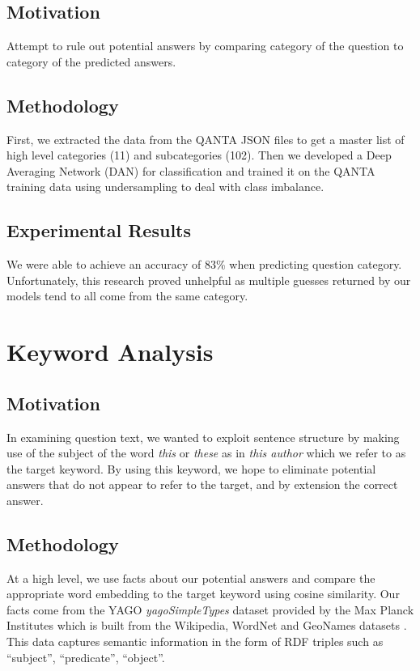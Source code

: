 \documentclass[11pt,a4paper]{article}
\begin{document}
\subsection{Motivation}
Attempt to rule out potential answers by comparing category of the question to category of the predicted answers.

\subsection{Methodology}
First, we extracted the data from the \textsc{QANTA} JSON files to get a master list of high level categories (11) and subcategories (102).  Then we developed a Deep Averaging Network (\textsc{DAN}) for classification and trained it on the \textsc{QANTA} training data using undersampling to deal with class imbalance.

\subsection{Experimental Results}
We were able to achieve an accuracy of 83\% when predicting question category.  Unfortunately, this research proved unhelpful as multiple guesses returned by our models tend to all come from the same category.


\section{Keyword Analysis}

\subsection{Motivation}
In examining question text, we wanted to exploit sentence structure by making use of the subject of the word \textit{this} or \textit{these} as in \textit{this author} which we refer to as the target keyword.  By using this keyword, we hope to eliminate potential answers that do not appear to refer to the target, and by extension the correct answer.

\subsection{Methodology}
At a high level, we use facts about our potential answers and compare the appropriate word embedding to the target keyword using cosine similarity. Our facts come from the \textsc{YAGO} \textit{yagoSimpleTypes} dataset provided by the Max Planck Institutes which is built from the  Wikipedia, WordNet and GeoNames datasets .  This data captures semantic information in the form of \textsc{RDF} triples such as ``subject'', ``predicate'', ``object''.
\end{document}
